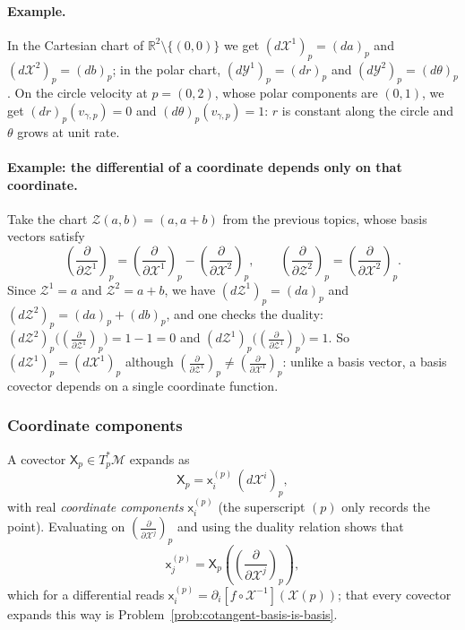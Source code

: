 \documentclass[11pt]{article}
\newcommand{\TpsM}{T_p^*\mathcal M}
\begin{document}
\paragraph{Example.} In the Cartesian chart of $\mathbb R^2\setminus\{(0,0)\}$ we get $(d\mathcal X^1)_p=(da)_p$ and $(d\mathcal X^2)_p=(db)_p$; in the polar chart, $(d\mathcal Y^1)_p=(dr)_p$ and $(d\mathcal Y^2)_p=(d\theta)_p$. On the circle velocity at $p=(0,2)$, whose polar components are $(0,1)$, we get $(dr)_p(v_{\gamma,p})=0$ and $(d\theta)_p(v_{\gamma,p})=1$: $r$ is constant along the circle and $\theta$ grows at unit rate.

\paragraph{Example: the differential of a coordinate depends only on that coordinate.} Take the chart $\mathcal Z(a,b)=(a,a+b)$ from the previous topics, whose basis vectors satisfy
\[
\left(\frac{\partial}{\partial\mathcal Z^1}\right)_p=\left(\frac{\partial}{\partial\mathcal X^1}\right)_p-\left(\frac{\partial}{\partial\mathcal X^2}\right)_p,\qquad\left(\frac{\partial}{\partial\mathcal Z^2}\right)_p=\left(\frac{\partial}{\partial\mathcal X^2}\right)_p.
\]
Since $\mathcal Z^1=a$ and $\mathcal Z^2=a+b$, we have $(d\mathcal Z^1)_p=(da)_p$ and $(d\mathcal Z^2)_p=(da)_p+(db)_p$, and one checks the duality: $(d\mathcal Z^2)_p\big(\left(\frac{\partial}{\partial\mathcal Z^1}\right)_p\big)=1-1=0$ and $(d\mathcal Z^1)_p\big(\left(\frac{\partial}{\partial\mathcal Z^1}\right)_p\big)=1$. So $(d\mathcal Z^1)_p=(d\mathcal X^1)_p$ although $\left(\frac{\partial}{\partial\mathcal Z^1}\right)_p\neq\left(\frac{\partial}{\partial\mathcal X^1}\right)_p$: unlike a basis vector, a basis covector depends on a single coordinate function.

\subsubsection*{Coordinate components}
A covector $\mathsf X_p\in\TpsM$ expands as
\[
\mathsf X_p=\mathsf x^{(p)}_i\,(d\mathcal X^i)_p,
\]
with real \emph{coordinate components} $\mathsf x^{(p)}_i$ (the superscript $(p)$ only records the point). Evaluating on $\left(\frac{\partial}{\partial\mathcal X^j}\right)_p$ and using the duality relation shows that
\[
\mathsf x^{(p)}_j=\mathsf X_p\!\left(\left(\frac{\partial}{\partial\mathcal X^j}\right)_p\right),
\]
which for a differential reads $\mathsf x^{(p)}_i=\partial_i[f\circ\mathcal X^{-1}](\mathcal X(p))$; that every covector expands this way is Problem~\ref{prob:cotangent-basis-is-basis}.
\end{document}
